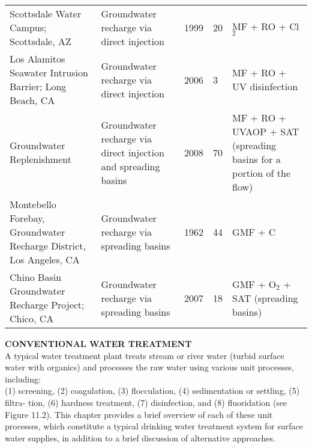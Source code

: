 \begin{table}[]
\begin{tabular}{lllll}
Scottsdale Water Campus; Scottsdale, AZ                            & Groundwater recharge via direct injection                      & 1999 & 20             & MF + RO + Cl$_2$ \\
Los Alamitos Seawater Intrusion Barrier; Long Beach, CA            & Groundwater recharge via direct injection                      & 2006 & 3              & MF + RO + UV disinfection                                          \\
Groundwater Replenishment                                          & Groundwater recharge via direct injection and spreading basins & 2008 & 70             & MF + RO + UVAOP + SAT (spreading basins for a portion of the flow) \\
Montebello Forebay, Groundwater Recharge District, Los Angeles, CA & Groundwater recharge via spreading basins                      & 1962 & 44             & GMF + C                                                            \\
Chino Basin Groundwater Recharge Project; Chico, CA                & Groundwater recharge via spreading basins                      & 2007 & 18             & GMF + O$_2$ + SAT (spreading basins)
\end{tabular}
\end{table}

\textbf{CONVENTIONAL WATER TREATMENT}\\
A typical water treatment plant treats stream or river water (turbid surface water with organics) and processes the raw water using various unit processes, including:\\
(1) screening, (2) coagulation, (3) flocculation, (4) sedimentation or settling, (5) filtra-
tion, (6) hardness treatment, (7) disinfection, and (8) fluoridation (see Figure 11.2). This chapter provides a brief overview of each of these unit processes, which constitute a typical drinking water treatment system for surface water supplies, in addition to a brief discussion of alternative approaches.\\

